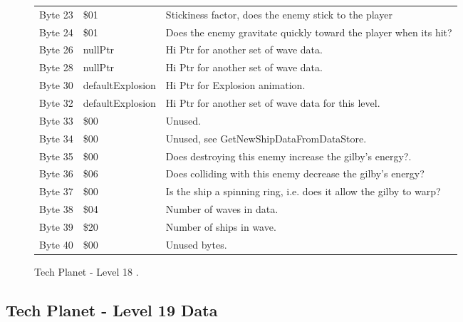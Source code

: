 \begin{figure}[H]
{\begin{adjustbox}{width=12cm}
\begin{tabular}{lll}
 Byte 23 & \$01                        & Stickiness factor, does the enemy stick to the player              \\
 Byte 24 & \$01                        & Does the enemy gravitate quickly toward the player when its hit?   \\
 Byte 26 & nullPtr                    & Hi Ptr for another set of wave data.                               \\
 Byte 28 & nullPtr                    & Hi Ptr for another set of wave data.                               \\
 Byte 30 & defaultExplosion           & Hi Ptr for Explosion animation.                                    \\
 Byte 32 & defaultExplosion           & Hi Ptr for another set of wave data for this level.                \\
 Byte 33 & \$00                        & Unused.                                                            \\
 Byte 34 & \$00                        & Unused, see GetNewShipDataFromDataStore.                           \\
 Byte 35 & \$00                        & Does destroying this enemy increase the gilby's energy?.           \\
 Byte 36 & \$06                        & Does colliding with this enemy decrease the gilby's energy?        \\
 Byte 37 & \$00                        & Is the ship a spinning ring, i.e. does it allow the gilby to warp? \\
 Byte 38 & \$04                        & Number of waves in data.                                           \\
 Byte 39 & \$20                        & Number of ships in wave.                                           \\
 Byte 40 & \$00                        & Unused bytes.                                                      \\
\bottomrule
\end{tabular}

  \end{adjustbox}

  }\caption*{Tech Planet - Level 18
.}
\end{figure}

\clearpage
\subsection{Tech Planet - Level 19 Data}

